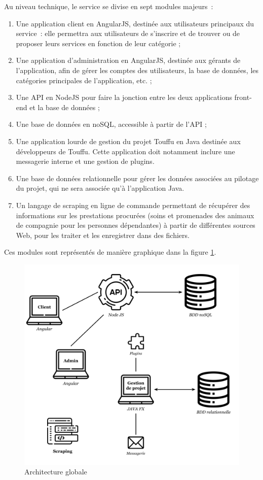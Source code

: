 \documentclass[conference]{IEEEtran}
\begin{document}
Au niveau technique, le service se divise en sept modules majeurs :
\begin{enumerate}
	\item Une application client en AngularJS, destinée aux utilisateurs principaux du service : elle permettra aux utilisateurs de s'inscrire et de trouver ou de proposer leurs services en fonction de leur catégorie ;
	\item Une application d'administration en AngularJS, destinée aux gérants de l'application, afin de gérer les comptes des utilisateurs, la base de données, les catégories principales de l'application, etc. ;
	\item Une API en NodeJS pour faire la jonction entre les deux applications front-end et la base de données ;
	\item Une base de données en noSQL, accessible à partir de l'API ;
	\item Une application lourde de gestion du projet Touffu en Java destinée aux développeurs de Touffu. Cette application doit notamment inclure une messagerie interne et une gestion de plugins.
	\item Une base de données relationnelle pour gérer les données associées au pilotage du projet, qui ne sera associée qu'à l'application Java.
	\item Un langage de scraping en ligne de commande permettant de récupérer des informations sur les prestations procurées (soins et promenades des animaux de compagnie pour les personnes dépendantes) à partir de différentes sources Web, pour les traiter et les enregistrer dans des fichiers.
\end{enumerate}
Ces modules sont représentés de manière graphique dans la figure \ref{fig:architecture}.

\begin{figure}[h]
    \centering
    \includegraphics[width=\columnwidth]{Ressources/Images/Architecture.png}
    \caption{Architecture globale}
    \label{fig:architecture}
\end{figure}
\end{document}

